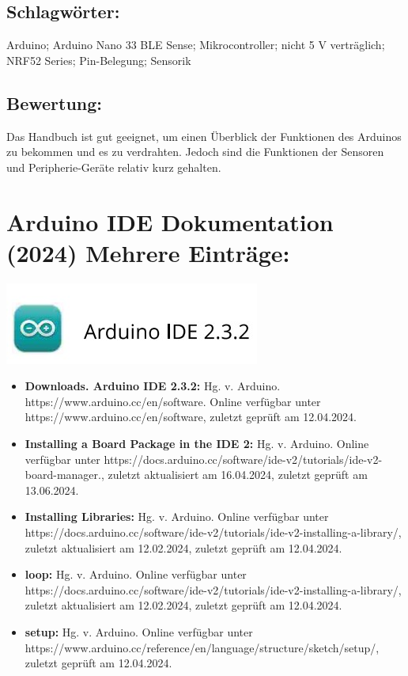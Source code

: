 \subsection*{Schlagwörter:}
Arduino; Arduino Nano 33 BLE Sense; Mikrocontroller; nicht 5 V verträglich; NRF52 Series; Pin-Belegung; Sensorik
\subsection*{Bewertung:}
Das Handbuch ist gut geeignet, um einen Überblick der Funktionen des Arduinos zu bekommen und es zu verdrahten. Jedoch sind die Funktionen der Sensoren und Peripherie-Geräte relativ kurz gehalten.

\section*{Arduino IDE Dokumentation (2024) Mehrere Einträge:}
	\includegraphics[width=0.5\linewidth]{../Appendix/Literaturverzeichnis/img/IDE.jpg}
\begin{itemize}
	\item \textbf{Downloads. Arduino IDE 2.3.2:}
	Hg. v. Arduino. https://www.arduino.cc/en/software. Online verfügbar unter https://www.arduino.cc/en/software, zuletzt geprüft am 12.04.2024.
	\item \textbf{Installing a Board Package in the IDE 2:}
	Hg. v. Arduino. Online verfügbar unter https://docs.arduino.cc/software/ide-v2/tutorials/ide-v2-board-manager., zuletzt aktualisiert am 16.04.2024, zuletzt geprüft am 13.06.2024.
	\item \textbf{Installing Libraries:}
	Hg. v. Arduino. Online verfügbar unter https://docs.arduino.cc/software/ide-v2/tutorials/ide-v2-installing-a-library/, zuletzt aktualisiert am 12.02.2024, zuletzt geprüft am 12.04.2024.
	\item \textbf{loop:} Hg. v. Arduino. Online verfügbar unter https://docs.arduino.cc/software/ide-v2/tutorials/ide-v2-installing-a-library/, zuletzt aktualisiert am 12.02.2024, zuletzt geprüft am 12.04.2024.
	\item \textbf{setup:} Hg. v. Arduino. Online verfügbar unter https://www.arduino.cc/reference/en/language/structure/sketch/setup/, zuletzt geprüft am 12.04.2024.
\end{itemize}
